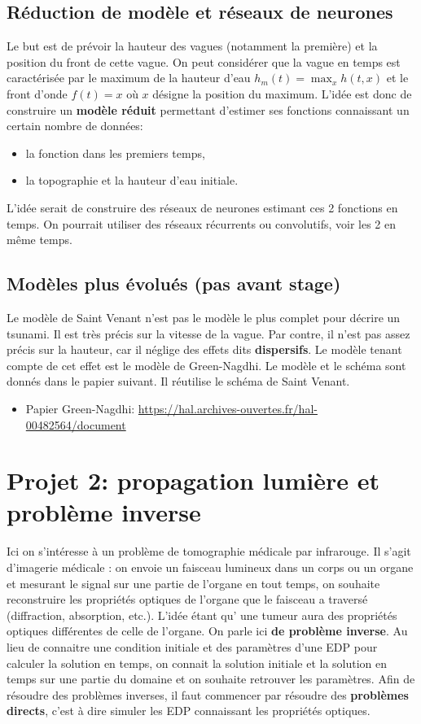 \documentclass[11pt]{article}
\theoremstyle{definition}
\begin{document}
\subsection{Réduction de modèle et réseaux de neurones}
Le but est de prévoir la hauteur des vagues (notamment la première) et la position du front de cette vague. On peut considérer que la vague en temps est caractérisée par le maximum de la hauteur d'eau $h_m(t)= \max_x h(t,x)$ et le front d'onde $f(t)=x$ où $x$ désigne la position du maximum.
L'idée est donc de construire un \textbf{modèle réduit} permettant d'estimer ses fonctions connaissant un certain nombre de données: 
\begin{itemize}
\item la fonction dans les premiers temps,
\item la topographie et la hauteur d'eau initiale.
\end{itemize}
L'idée serait de construire des réseaux de neurones estimant ces 2 fonctions en temps. On pourrait utiliser des réseaux récurrents ou convolutifs, voir les 2 en même temps.

\subsection{Modèles plus évolués (pas avant stage)}
Le modèle de Saint Venant n'est pas le modèle le plus complet pour décrire un tsunami. Il est très précis sur la vitesse de la vague. Par contre, il n'est pas assez précis sur la hauteur, car il néglige des effets dits \textbf{dispersifs}. Le modèle tenant compte de cet effet est le modèle de Green-Nagdhi. Le modèle et le schéma sont donnés dans le papier suivant. Il réutilise le schéma de Saint Venant.

\begin{itemize}
\item Papier Green-Nagdhi: \url{https://hal.archives-ouvertes.fr/hal-00482564/document}
\end{itemize}



\section{Projet 2: propagation lumière et problème inverse}
Ici on s'intéresse à un problème de tomographie médicale par infrarouge. Il s'agit d'imagerie médicale : on envoie un faisceau lumineux dans un corps ou un organe et mesurant le signal sur une partie de l'organe en tout temps, on souhaite reconstruire les propriétés optiques de l'organe que le faisceau a traversé (diffraction, absorption, etc.). L'idée étant qu’ une tumeur aura des propriétés optiques différentes de celle de l'organe. On parle ici \textbf{de problème inverse}. Au lieu de connaitre une condition initiale et des paramètres d'une EDP pour calculer la solution en temps, on connait la solution initiale et la solution en temps sur une partie du domaine et on souhaite retrouver les paramètres. Afin de résoudre des problèmes inverses, il faut commencer par résoudre des \textbf{problèmes directs}, c'est à dire simuler les EDP connaissant les propriétés optiques.
\end{document}
